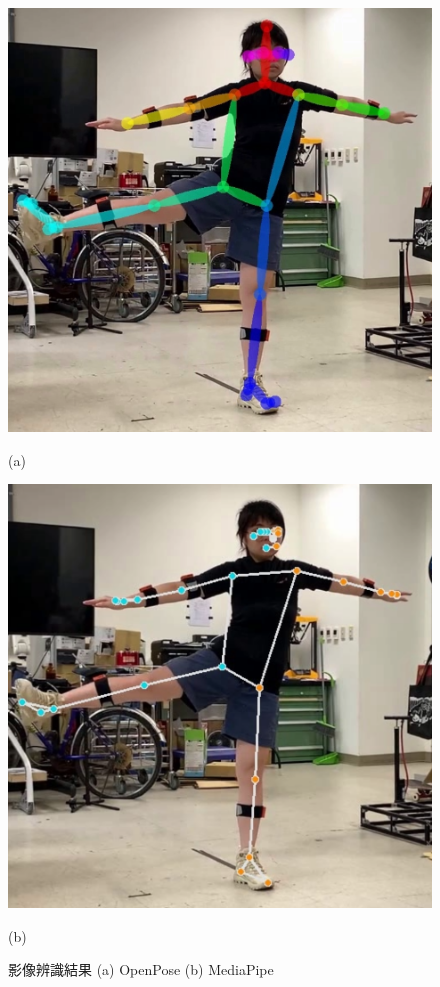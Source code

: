 \begin{figure}[!ht]
    \centering
    \begin{minipage}{.5\textwidth}
      \centering
      \includegraphics[width=\linewidth]{figure/ch2_fig_rec_openpose.png}
      \caption*{(a)}
    \end{minipage}%
    \begin{minipage}{.5\textwidth}
       \centering
       \includegraphics[width=\linewidth]{figure/ch2_fig_rec_mediapipe.png}
       \caption*{(b)}
    \end{minipage}
    \caption[影像辨識結果 (a) OpenPose (b) MediaPipe]{影像辨識結果 (a) OpenPose (b) MediaPipe}
    \label{ch2_fig_rec_result}
\end{figure}

